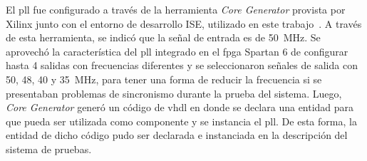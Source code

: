 		El \acrshort{pll} fue configurado a través de la herramienta {\it Core Generator} provista por Xilinx junto con el entorno de desarrollo ISE, utilizado en este trabajo~\cite{XilinxInc}. A través de esta herramienta, se indicó que la señal de entrada es de \SI{50}{\mega\hertz}. Se aprovechó la característica del \acrshort{pll} integrado en el \acrshort{fpga} Spartan 6 de configurar hasta 4 salidas con frecuencias diferentes y se seleccionaron señales de salida con \si{50}, \si{48}, \si{40} y \SI{35}{\mega\hertz}, para tener una forma de reducir la frecuencia si se presentaban problemas de sincronismo durante la prueba del sistema. Luego, {\it Core Generator} generó un código de \acrshort{vhdl} en donde se declara una entidad para que pueda ser utilizada como componente y se instancia el \acrshort{pll}. De esta forma, la entidad de dicho código pudo ser declarada e instanciada en la descripción del sistema de pruebas.
		
%		
%	
		
		
%	
		
